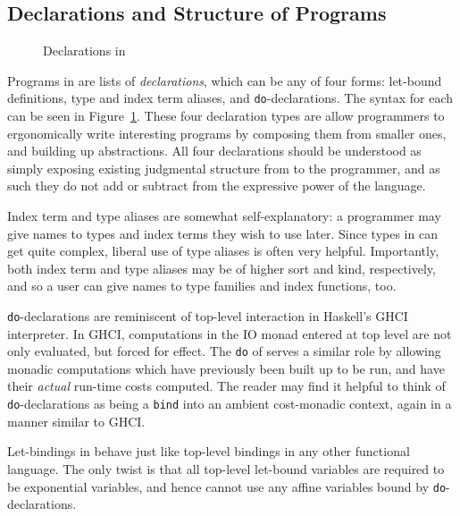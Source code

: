 \subsection{Declarations and Structure of \lambdaamorimpl Programs}
\begin{figure}

\caption{Declarations in \lambdaamorimpl}
\label{fig:lambdaamorimmpl-decls}
\end{figure}

Programs in \lambdaamorimpl are lists of \textit{declarations}, which can be any of four forms: let-bound definitions, type and index term aliases, and \texttt{do}-declarations. The syntax for each can be seen in Figure~\ref{fig:lambdaamorimmpl-decls}. These four declaration types are allow programmers to ergonomically write interesting programs by composing them from smaller ones, and building up abstractions. All four declarations should be understood as simply exposing existing judgmental structure from \dlambdaamor to the programmer, and as such they do not add or subtract from the expressive power of the language.

Index term and type aliases are somewhat self-explanatory: a programmer may give names to types and index terms they wish to use later. Since types in \lambdaamorimpl can get quite complex, liberal use of type aliases is often very helpful. Importantly, both index term and type aliases may be of higher sort and kind, respectively, and so a user can give names to type families and index functions, too.

\texttt{do}-declarations are reminiscent of top-level interaction in Haskell's GHCI interpreter. In GHCI, computations in the IO monad entered at top level are not only evaluated, but forced for effect. The \texttt{do} of \lambdaamorimpl serves a similar role by allowing monadic computations which have previously been built up to be run, and have their \textit{actual} run-time costs computed. The reader may find it helpful to think of \texttt{do}-declarations as being a \texttt{bind} into an ambient cost-monadic context, again in a manner similar to GHCI.

Let-bindings in \lambdaamorimpl behave just like top-level bindings in any other functional language. The only twist is that all top-level let-bound variables are required to be exponential variables, and hence cannot use any affine variables bound by \texttt{do}-declarations.


